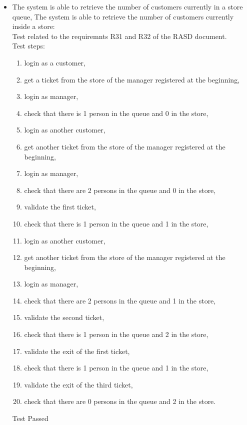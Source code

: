 \begin{itemize}

    \item The system is able to retrieve the number of customers currently in a store queue, The system is able to retrieve the number of customers currently inside a store: \\
    Test related to the requiremnts R31 and R32 of the RASD document. \\
    Test steps: \\
    \begin{enumerate}
        \item login as a customer,
        \item get a ticket from the store of the manager registered at the beginning,
        \item login as manager,
        \item check that there is 1 person in the queue and 0 in the store,
        \item login as another customer,
        \item get another ticket from the store of the manager registered at the beginning,
        \item login as manager,
        \item check that there are 2 persons in the queue and 0 in the store,
        \item validate the first ticket,
        \item check that there is 1 person in the queue and 1 in the store,
        \item login as another customer,
        \item get another ticket from the store of the manager registered at the beginning,
        \item login as manager,
        \item check that there are 2 persons in the queue and 1 in the store,
        \item validate the second ticket,
        \item check that there is 1 person in the queue and 2 in the store,
        \item validate the exit of the first ticket,
        \item check that there is 1 person in the queue and 1 in the store,
        \item validate the exit of the third ticket,
        \item check that there are 0 persons in the queue and 2 in the store.
    \end{enumerate}
    Test Passed \\


\end{itemize}
